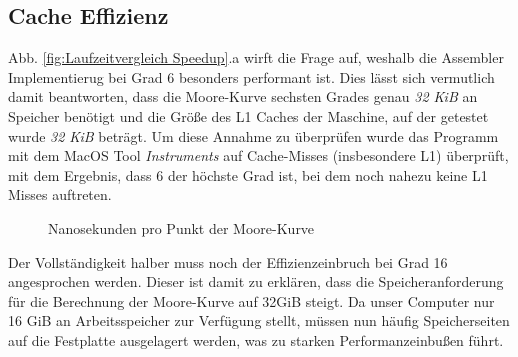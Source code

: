 \documentclass[course=erap]{aspdoc}
\begin{document}
\subsection{Cache Effizienz}
Abb. \ref{fig:Laufzeitvergleich Speedup}.a wirft die Frage auf, weshalb die Assembler Implementierug bei Grad 6 besonders performant ist. Dies lässt sich vermutlich damit beantworten, dass die Moore-Kurve sechsten Grades genau \textit{32 KiB} an Speicher benötigt und die Größe des L1 Caches der Maschine, auf der getestet wurde \textit{32 KiB} beträgt. Um diese Annahme zu überprüfen wurde das Programm mit dem MacOS Tool \textit{Instruments} auf Cache-Misses (insbesondere L1) überprüft, mit dem Ergebnis, dass 6 der höchste Grad ist, bei dem noch nahezu keine L1 Misses auftreten.

\begin{figure}[h] 
    \centering
    \qquad
    \caption{Nanosekunden pro Punkt der Moore-Kurve}%
    \label{fig:Laufzeitvergleich Skaliert}%
 \end{figure}
 
 Der Vollständigkeit halber muss noch der Effizienzeinbruch bei Grad 16 angesprochen werden. Dieser ist damit zu erklären, dass die Speicheranforderung für die Berechnung der Moore-Kurve auf 32GiB steigt. Da unser Computer nur 16 GiB an Arbeitsspeicher zur Verfügung stellt, müssen nun häufig Speicherseiten auf die Festplatte ausgelagert werden, was zu starken Performanzeinbußen führt.


\FloatBarrier
\end{document}
